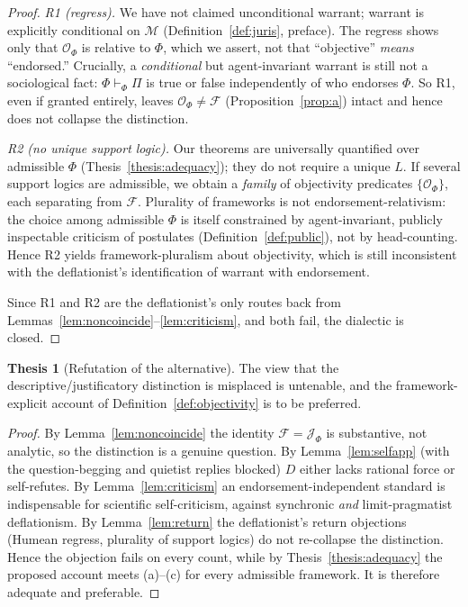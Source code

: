\documentclass{amsart}
\theoremstyle{definition}
\newtheorem{thesis}{Thesis}
\theoremstyle{plain}
\theoremstyle{remark}
\begin{document}
\begin{proof}
\emph{R1 (regress).} We have not claimed unconditional warrant; warrant is
explicitly conditional on $\mathcal{M}$ (Definition~\ref{def:juris}, preface).
The regress shows only that $\mathcal{O}_\Phi$ is relative to $\Phi$, which we
assert, not that ``objective'' \emph{means} ``endorsed.'' Crucially, a
\emph{conditional} but agent-invariant warrant is still not a sociological fact:
$\Phi\vdash_\Phi\Pi$ is true or false independently of who endorses $\Phi$. So
R1, even if granted entirely, leaves $\mathcal{O}_\Phi\neq\mathcal{F}$
(Proposition~\ref{prop:a}) intact and hence does not collapse the distinction.

\emph{R2 (no unique support logic).} Our theorems are universally quantified
over admissible $\Phi$ (Thesis~\ref{thesis:adequacy}); they do not require a
unique $L$. If several support logics are admissible, we obtain a \emph{family}
of objectivity predicates $\{\mathcal{O}_\Phi\}$, each separating from
$\mathcal{F}$. Plurality of frameworks is not endorsement-relativism: the
choice among admissible $\Phi$ is itself constrained by agent-invariant,
publicly inspectable criticism of postulates (Definition~\ref{def:public}), not
by head-counting. Hence R2 yields framework-pluralism about objectivity, which
is still inconsistent with the deflationist's identification of warrant with
endorsement.

Since R1 and R2 are the deflationist's only routes back from
Lemmas~\ref{lem:noncoincide}--\ref{lem:criticism}, and both fail, the dialectic
is closed.
\end{proof}

\begin{thesis}[Refutation of the alternative]\label{thesis:refute}
The view that the descriptive/justificatory distinction is misplaced is
untenable, and the framework-explicit account of
Definition~\ref{def:objectivity} is to be preferred.
\end{thesis}

\begin{proof}
By Lemma~\ref{lem:noncoincide} the identity $\mathcal{F}=\mathcal{J}_\Phi$ is
substantive, not analytic, so the distinction is a genuine question. By
Lemma~\ref{lem:selfapp} (with the question-begging and quietist replies
blocked) $D$ either lacks rational force or self-refutes. By
Lemma~\ref{lem:criticism} an endorsement-independent standard is indispensable
for scientific self-criticism, against synchronic \emph{and} limit-pragmatist
deflationism. By Lemma~\ref{lem:return} the deflationist's return objections
(Humean regress, plurality of support logics) do not re-collapse the
distinction. Hence the objection fails on every count, while by
Thesis~\ref{thesis:adequacy} the proposed account meets (a)--(c) for every
admissible framework. It is therefore adequate and preferable.
\end{proof}
\end{document}
